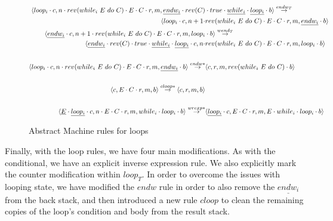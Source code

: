 \begin{figure}[ht]
\begin{align*}
    \astate{loop_i}{n \cdot rev(while_i\ E\ do\ C) \cdot E \cdot C}{}{\underline{endw_i} \cdot rev(C)& \cdot true \cdot \underline{while_i} \cdot \underline{loop_i}} 
    \arule{endw_T}\\
    \astate{loop_i}{n + 1 \cdot &rev(while_i\ E\ do\ C) \cdot E \cdot C}{}{\underline{endw_i}} \\
    \bstate{\underline{endw_i}}{n + 1 \cdot rev(while_i\ E\ do\ C) \cdot E \cdot C}{}{loop_i&} 
    \arule{wend_T}\\
    \bstate{\underline{endw_i} \cdot rev(C) \cdot true \cdot \underline{while_i} \cdot \underline{loop_i}}{n \cdot &rev(while_i\ E\ do\ C) \cdot E \cdot C}{}{loop_i} \\
    \\
    \astate{loop_i}{n \cdot rev(while_i\ E\ do\ C) \cdot E \cdot C}{}{\underline{endw_i}} \arule{endw*}& \astate{}{}{}{rev(while_i\ E\ do\ C)} \\
    \\
    \astate{}{E \cdot C}{}{} \arule{cloop*} \astate{}{}{}{} \\
    \\
    \bstate{\underline{E} \cdot \underline{loop_i}}{n \cdot E \cdot C}{}{while_i \cdot loop_i} \arule{wrexp*}& \bstate{\underline{loop_i}}{E \cdot C}{}{E \cdot while_i \cdot loop_i}
    \end{align*}
    \caption{Abstract Machine rules for loops}
    \label{fig:abstract_machine_loops}
\end{figure}
\newpage
Finally, with the loop rules, we have four main modifications. As with the conditional, we have an explicit inverse expression rule. We also explicitly mark the counter modification within $loop_T$. 
In order to overcome the issues with looping state, we have modified the $endw$ rule in order to also remove the $\underline{endw_i}$ from the back stack, and then introduced a new rule $cloop$ to clean the remaining copies of the loop's condition and body from the result stack.